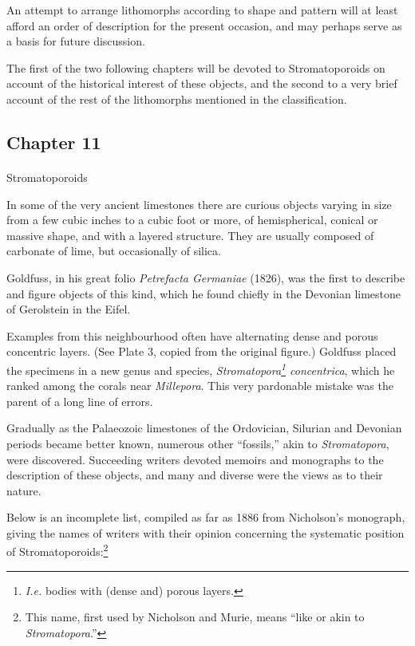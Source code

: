 \documentclass[a4paper, 12pt, oneside]{article}
\begin{document}
An attempt to arrange lithomorphs according to shape and pattern will at least afford an order of description for the present occasion, and may perhaps serve as a basis for future discussion.

The first of the two following chapters will be devoted to Stromatoporoids on account of the historical interest of these objects, and the second to a very brief account of the rest of the lithomorphs mentioned in the classification.
\clearpage
\subsection{Chapter 11}
\paragraph{}
Stromatoporoids

In some of the very ancient limestones there are curious objects varying in size from a few cubic inches to a cubic foot or more, of hemispherical, conical or massive shape, and with a layered structure. They are usually composed of carbonate of lime, but occasionally of silica.

Goldfuss, in his great folio \emph{Petrefacta Germaniae} (1826), was the first to describe and figure objects of this kind, which he found chiefly in the Devonian limestone of Gerolstein in the Eifel.

Examples from this neighbourhood often have alternating dense and porous concentric layers. (See Plate 3, copied from the original figure.) Goldfuss placed the specimens in a new genus and species, \emph{Stromatopora\footnote{\emph{I.e.} bodies with (dense and) porous layers.} concentrica}, which he ranked among the corals near \emph{Millepora}. This very pardonable mistake was the parent of a long line of errors.

Gradually as the Palaeozoic limestones of the Ordovician, Silurian and Devonian periods became better known, numerous other ``fossils,'' akin to \emph{Stromatopora}, were discovered. Succeeding writers devoted memoirs and monographs to the description of these objects, and many and diverse were the views as to their nature.

Below is an incomplete list, compiled as far as 1886 from Nicholson's monograph, giving the names of writers with their opinion concerning the systematic position of Stromatoporoids:\footnote{This name, first used by Nicholson and Murie, means ``like or akin to \emph{Stromatopora}.''}
\end{document}
